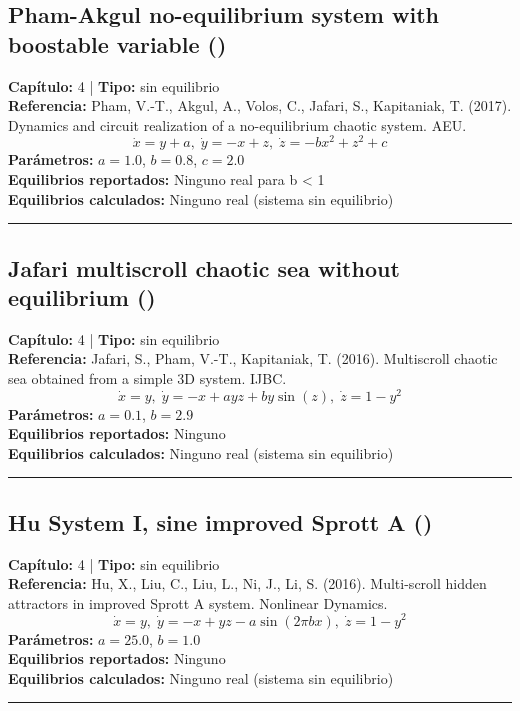 \subsection*{Pham-Akgul no-equilibrium system with boostable variable ()}
\textbf{Capítulo:} 4 | \textbf{Tipo:} sin equilibrio\\
\textbf{Referencia:} Pham, V.-T., Akgul, A., Volos, C., Jafari, S., Kapitaniak, T. (2017). Dynamics and circuit realization of a no-equilibrium chaotic system. AEU.\\
\[\dot{x}=y+a, \; \dot{y}=-x+z, \; \dot{z}=-bx^2+z^2+c\]
\textbf{Parámetros:} $a = 1.0$, $b = 0.8$, $c = 2.0$\\
\textbf{Equilibrios reportados:} Ninguno real para b < 1\\
\textbf{Equilibrios calculados:} Ninguno real (sistema sin equilibrio)\\
\hrule

\subsection*{Jafari multiscroll chaotic sea without equilibrium ()}
\textbf{Capítulo:} 4 | \textbf{Tipo:} sin equilibrio\\
\textbf{Referencia:} Jafari, S., Pham, V.-T., Kapitaniak, T. (2016). Multiscroll chaotic sea obtained from a simple 3D system. IJBC.\\
\[\dot{x}=y, \; \dot{y}=-x+ayz+by\sin(z), \; \dot{z}=1-y^2\]
\textbf{Parámetros:} $a = 0.1$, $b = 2.9$\\
\textbf{Equilibrios reportados:} Ninguno\\
\textbf{Equilibrios calculados:} Ninguno real (sistema sin equilibrio)\\
\hrule

\subsection*{Hu System I, sine improved Sprott A ()}
\textbf{Capítulo:} 4 | \textbf{Tipo:} sin equilibrio\\
\textbf{Referencia:} Hu, X., Liu, C., Liu, L., Ni, J., Li, S. (2016). Multi-scroll hidden attractors in improved Sprott A system. Nonlinear Dynamics.\\
\[\dot{x}=y, \; \dot{y}=-x+yz-a\sin(2\pi bx), \; \dot{z}=1-y^2\]
\textbf{Parámetros:} $a = 25.0$, $b = 1.0$\\
\textbf{Equilibrios reportados:} Ninguno\\
\textbf{Equilibrios calculados:} Ninguno real (sistema sin equilibrio)\\
\hrule


